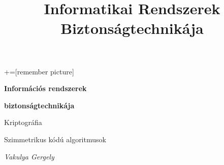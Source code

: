 \documentclass[12 pt]{beamer}
\author{}
\title{Informatikai Rendszerek Biztonságtechnikája}
\institute{}
\date{}
\newcommand{\titleimage}{title}			%
\begin{document}
+=[remember picture]

{

  \begin{frame}[c]
    \begin{center}

      \Large
      \textbf{Információs rendszerek}

      \textbf{biztonságtechnikája}

      \qquad

      Kriptográfia

      Szimmetrikus kódú algoritmusok

      \qquad

      \textit{Vakulya Gergely}







\end{center}
\end{frame}}
\end{document}
